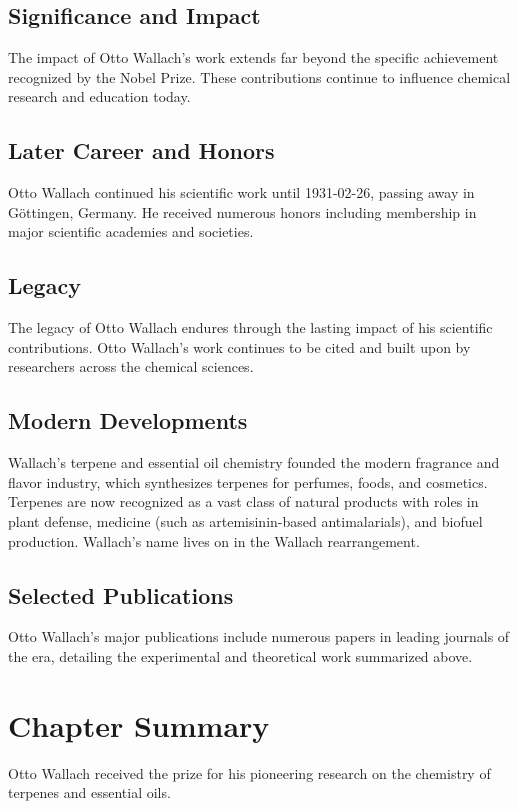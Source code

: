 \subsection*{Significance and Impact}

The impact of Otto Wallach's work extends far beyond the specific achievement recognized by the Nobel Prize.
These contributions continue to influence chemical research and education today.

\subsection*{Later Career and Honors}

Otto Wallach continued his scientific work until 1931-02-26, passing away in Göttingen, Germany.
He received numerous honors including membership in major scientific academies and societies.

\subsection*{Legacy}

The legacy of Otto Wallach endures through the lasting impact of his scientific contributions.
Otto Wallach's work continues to be cited and built upon by researchers across the chemical sciences.

\subsection*{Modern Developments}

Wallach's terpene and essential oil chemistry founded the modern fragrance and flavor industry, which synthesizes terpenes for perfumes, foods, and cosmetics. Terpenes are now recognized as a vast class of natural products with roles in plant defense, medicine (such as artemisinin-based antimalarials), and biofuel production. Wallach's name lives on in the Wallach rearrangement.

\subsection*{Selected Publications}

Otto Wallach's major publications include numerous papers in leading journals of the era, detailing the experimental and theoretical work summarized above.

\clearpage

\section*{Chapter Summary}

Otto Wallach received the prize for his pioneering research on the chemistry of terpenes and essential oils.
